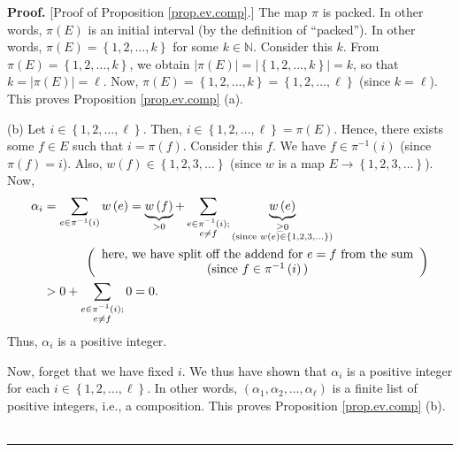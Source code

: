 \documentclass[numbers=enddot,12pt,final,onecolumn,notitlepage,abstracton]{scrartcl}
\theoremstyle{definition}
\newenvironment{proof}[1][Proof]{\noindent\textbf{#1.} }{\ \rule{0.5em}{0.5em}}
\let\sumnonlimits\sum
\renewcommand{\sum}{\sumnonlimits\limits}
\newenvironment{verlong}{}{}
\newcommand{\NN}{{\mathbb{N}}}
\begin{document}
\begin{verlong}
\begin{proof}
[Proof of Proposition \ref{prop.ev.comp}.] The map $\pi$ is packed. In other
words, $\pi\left(  E\right)  $ is an initial interval (by the definition of
\textquotedblleft packed\textquotedblright). In other words, $\pi\left(
E\right)  =\left\{  1,2,\ldots,k\right\}  $ for some $k\in \NN $.
Consider this $k$. From $\pi\left(  E\right)  =\left\{  1,2,\ldots,k\right\}
$, we obtain $\left\vert \pi\left(  E\right)  \right\vert =\left\vert \left\{
1,2,\ldots,k\right\}  \right\vert =k$, so that $k=\left\vert \pi\left(
E\right)  \right\vert =\ell$. Now, $\pi\left(  E\right)  =\left\{
1,2,\ldots,k\right\}  =\left\{  1,2,\ldots,\ell\right\}  $ (since $k=\ell$).
This proves Proposition \ref{prop.ev.comp} (a).

(b) Let $i\in\left\{  1,2,\ldots,\ell\right\}  $. Then, $i\in\left\{
1,2,\ldots,\ell\right\}  =\pi\left(  E\right)  $. Hence, there exists some
$f\in E$ such that $i=\pi\left(  f\right)  $. Consider this $f$. We have
$f\in\pi^{-1}\left(  i\right)  $ (since $\pi\left(  f\right)  =i$). Also,
$w\left(  f\right)  \in\left\{  1,2,3,\ldots\right\}  $ (since $w$ is a map
$E\rightarrow\left\{  1,2,3,\ldots\right\}  $). Now,
\begin{align*}
\alpha_{i}  & =\sum_{e\in\pi^{-1}\left(  i\right)  }w\left(  e\right)
=\underbrace{w\left(  f\right)  }_{>0}+\sum_{\substack{e\in\pi^{-1}\left(
i\right)  ;\\e\neq f}}\underbrace{w\left(  e\right)  }_{\substack{\geq
0\\\text{(since }w\left(  e\right)  \in\left\{  1,2,3,\ldots\right\}
\text{)}}}\\
& \ \ \ \ \ \ \ \ \ \ \left(
\begin{array}[c]{c}
\text{here, we have split off the addend for }e=f\text{ from the sum}\\
\text{(since }f\in\pi^{-1}\left(  i\right)  \text{)}%
\end{array}
\right)  \\
& >0+\sum_{\substack{e\in\pi^{-1}\left(  i\right)  ;\\e\neq f}}0=0.
\end{align*}
Thus, $\alpha_{i}$ is a positive integer.

Now, forget that we have fixed $i$. We thus have shown that $\alpha_{i}$ is a
positive integer for each $i\in\left\{  1,2,\ldots,\ell\right\}  $. In other
words, $\left(  \alpha_{1},\alpha_{2},\ldots,\alpha_{\ell}\right)  $ is a
finite list of positive integers, i.e., a composition. This proves Proposition
\ref{prop.ev.comp} (b).
\end{proof}
\end{verlong}
\end{document}
